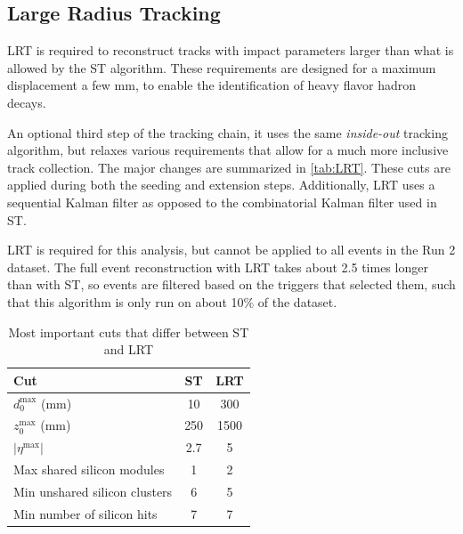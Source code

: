 \subsection{Large Radius Tracking}

\ac{LRT} is required to reconstruct tracks with impact parameters larger than what is allowed by the \ac{ST} algorithm. These requirements are designed for a maximum displacement a few mm, to enable the identification of heavy flavor hadron decays.

An optional third step of the tracking chain, it uses the same \emph{inside-out} tracking algorithm, but relaxes various requirements that allow for a much more inclusive track collection. The major changes are summarized in \autoref{tab:LRT}. These cuts are applied during both the seeding and extension steps. Additionally, \ac{LRT} uses a sequential Kalman filter as opposed to the combinatorial Kalman filter used in \ac{ST}.

\ac{LRT} is required for this analysis, but cannot be applied to all events in the Run 2 dataset. The full event reconstruction with \ac{LRT} takes about 2.5 times longer than with \ac{ST}, so events are filtered based on the triggers that selected them, such that this algorithm is only run on about 10\% of the dataset.


\begin{table}
\centering
\begin{tabular}{lcc}
\hline
Cut & \ac{ST} & \ac{LRT}  \\
\hline
$d_{0}^{\textrm{max}}$ (mm)   & 10   & 300 \\
$z_{0}^{\textrm{max}}$ (mm)   & 250   & 1500 \\
$ |\eta^{\textrm{max}}|$        & 2.7   & 5 \\
Max shared silicon modules    & 1     & 2 \\
Min unshared silicon clusters   & 6     & 5 \\
Min number of silicon hits   & 7     & 7 \\
\hline
\end{tabular}
\caption{Most important cuts that differ between \ac{ST} and \ac{LRT}}
\label{tab:LRT}
\end{table}

